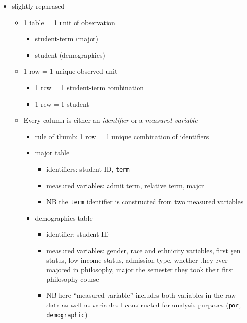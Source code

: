 \documentclass[
]{article}
\providecommand{\tightlist}{%
  \setlength{\itemsep}{0pt}\setlength{\parskip}{0pt}}
\begin{document}
\begin{itemize}
\tightlist
\item
  slightly rephrased

  \begin{itemize}
  \tightlist
  \item
    1 table = 1 unit of observation

    \begin{itemize}
    \tightlist
    \item
      student-term (major)
    \item
      student (demographics)
    \end{itemize}
  \item
    1 row = 1 unique observed unit

    \begin{itemize}
    \tightlist
    \item
      1 row = 1 student-term combination
    \item
      1 row = 1 student
    \end{itemize}
  \item
    Every column is either an \emph{identifier} or a \emph{measured variable}

    \begin{itemize}
    \tightlist
    \item
      rule of thumb: 1 row = 1 unique combination of identifiers
    \item
      major table

      \begin{itemize}
      \tightlist
      \item
        identifiers: student ID, \texttt{term}
      \item
        measured variables: admit term, relative term, major
      \item
        NB the \texttt{term} identifier is constructed from two measured variables
      \end{itemize}
    \item
      demographics table

      \begin{itemize}
      \tightlist
      \item
        identifier: student ID
      \item
        measured variables: gender, race and ethnicity variables, first gen status, low income status, admission type, whether they ever majored in philosophy, major the semester they took their first philosophy course
      \item
        NB here ``measured variable'' includes both variables in the raw data as well as variables I constructed for analysis purposes (\texttt{poc}, \texttt{demographic})
      \end{itemize}
    \end{itemize}
  \end{itemize}
\end{itemize}
\end{document}

